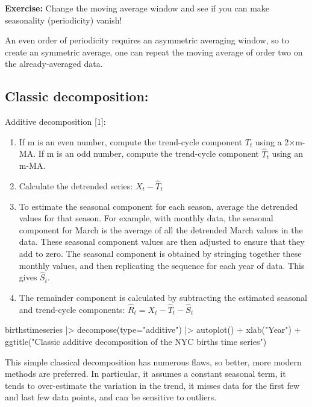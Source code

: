 \documentclass[
  letterpaper,
  DIV=11,
  numbers=noendperiod]{scrreprt}
\newenvironment{Shaded}{\begin{snugshade}}{\end{snugshade}}
\newcommand{\NormalTok}[1]{\textcolor[rgb]{0.00,0.23,0.31}{#1}}
\providecommand{\tightlist}{%
  \setlength{\itemsep}{0pt}\setlength{\parskip}{0pt}}\usepackage{longtable,booktabs,array}
\begin{document}
\textbf{Exercise:} Change the moving average window and see if you can
make seasonality (periodicity) vanish!

An even order of periodicity requires an asymmetric averaging window, so
to create an symmetric average, one can repeat the moving average of
order two on the already-averaged data.

\subsection{Classic decomposition:}\label{classic-decomposition}

Additive decomposition {[}1{]}:

\begin{enumerate}
\def\labelenumi{\arabic{enumi}.}
\tightlist
\item
  If m is an even number, compute the trend-cycle component \(T_t\)
  using a 2×m-MA. If m is an odd number, compute the trend-cycle
  component \(\hat T_t\) using an m-MA.
\item
  Calculate the detrended series: \(X_t - \hat T_t\)
\item
  To estimate the seasonal component for each season, average the
  detrended values for that season. For example, with monthly data, the
  seasonal component for March is the average of all the detrended March
  values in the data. These seasonal component values are then adjusted
  to ensure that they add to zero. The seasonal component is obtained by
  stringing together these monthly values, and then replicating the
  sequence for each year of data. This gives \(\hat S_t\).
\item
  The remainder component is calculated by subtracting the estimated
  seasonal and trend-cycle components:
  \(\hat R_t = X_t - \hat T_t - \hat S_t\)
\end{enumerate}

\begin{Shaded}
\begin{Highlighting}[]
\NormalTok{birthstimeseries |\textgreater{} decompose(type="additive") |\textgreater{}}
\NormalTok{  autoplot() + xlab("Year") +}
\NormalTok{  ggtitle("Classic additive decomposition}
\NormalTok{    of the NYC births time series")}
\end{Highlighting}
\end{Shaded}

This simple classical decomposition has numerous flaws, so better, more
modern methods are preferred. In particular, it assumes a constant
seasonal term, it tends to over-estimate the variation in the trend, it
misses data for the first few and last few data points, and can be
sensitive to outliers.
\end{document}
